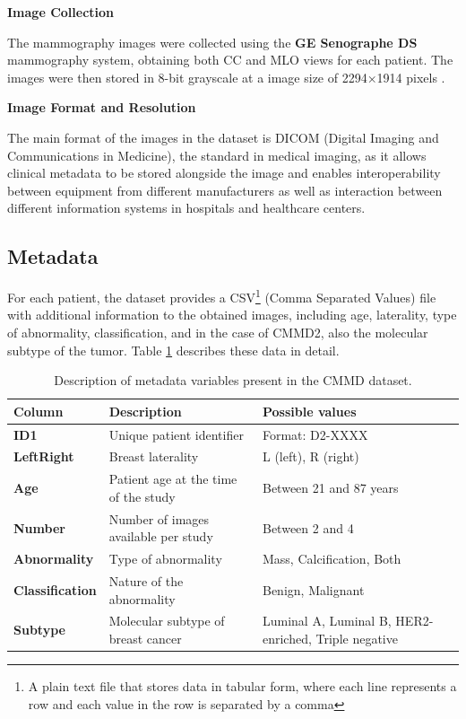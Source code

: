 \documentclass[a4paper,10pt]{book}
\begin{document}
\textbf{Image Collection}

The mammography images were collected using the \textbf{GE Senographe DS} mammography system, obtaining both CC and MLO views for each patient. The images were then stored in 8-bit grayscale at a image size of 2294×1914 pixels \cite{cai_online_2023}.

\textbf{Image Format and Resolution}

The main format of the images in the dataset is DICOM (Digital Imaging and Communications in Medicine), the standard in medical imaging, as it allows clinical metadata to be stored alongside the image and enables interoperability between equipment from different manufacturers as well as interaction between different information systems in hospitals and healthcare centers.

\newpage
\subsection{Metadata}

For each patient, the dataset provides a CSV\footnote{A plain text file that stores data in tabular form, where each line represents a row and each value in the row is separated by a comma} (Comma Separated Values) file with additional information to the obtained images, including age, laterality, type of abnormality, classification, and in the case of CMMD2, also the molecular subtype of the tumor. Table \ref{tab:cmmd2_metadata} describes these data in detail.

\begin{table}[h]
	\caption[CMMD2 metadata description]{Description of metadata variables present in the CMMD dataset.}
	\centering
	\begin{tabular}{>{\bfseries}l p{5cm} p{6cm}}
		\toprule
		\textbf{Column} & \textbf{Description}                 & \textbf{Possible values}                             \\
		\midrule
		ID1             & Unique patient identifier            & Format: D2-XXXX                                      \\
		LeftRight       & Breast laterality                    & L (left), R (right)                                  \\
		Age             & Patient age at the time of the study & Between 21 and 87 years                              \\
		Number          & Number of images available per study & Between 2 and 4                                      \\
		Abnormality     & Type of abnormality                  & Mass, Calcification, Both                            \\
		Classification  & Nature of the abnormality            & Benign, Malignant                                    \\
		Subtype         & Molecular subtype of breast cancer   & Luminal A, Luminal B, HER2-enriched, Triple negative \\
		\bottomrule
	\end{tabular}

	\label{tab:cmmd2_metadata}
\end{table}
\end{document}
